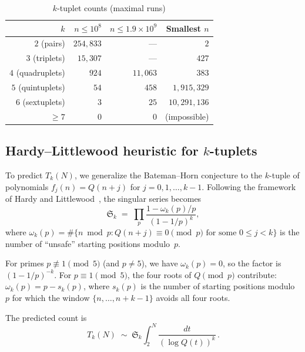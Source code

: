 \documentclass[11pt,a4paper]{article}
\theoremstyle{plain}
\theoremstyle{definition}
\theoremstyle{remark}
\begin{document}
\begin{table}[ht]
\centering
\caption{$k$-tuplet counts (maximal runs)}
\label{tab:tuplets}
\smallskip
\begin{tabular}{@{}rrrr@{}}
\toprule
$k$ & $n \le 10^8$ & $n \le 1.9 \times 10^9$ & Smallest $n$ \\
\midrule
$2$ (pairs) & $254{,}833$ & --- & $2$ \\
$3$ (triplets)  & $15{,}307$  & --- & $427$ \\
$4$ (quadruplets) & $924$ & $11{,}063$ & $383$ \\
$5$ (quintuplets) & $54$ & $458$ & $1{,}915{,}329$ \\
$6$ (sextuplets)  & $3$  & $25$  & $10{,}291{,}136$ \\
$\ge 7$ & $0$ & $0$ & (impossible) \\
\bottomrule
\end{tabular}
\end{table}


\subsection{Hardy--Littlewood heuristic for $k$-tuplets}

To predict $T_k(N)$, we generalize the Bateman--Horn conjecture to the $k$-tuple of polynomials $f_j(n) = Q(n + j)$ for $j = 0, 1, \ldots, k-1$. Following the framework of Hardy and Littlewood~\cite{hardy1923}, the singular series becomes
\begin{equation}\label{eq:Sk}
\mathfrak{S}_k \;=\; \prod_{p} \frac{1 - \omega_k(p)/p}{(1 - 1/p)^k},
\end{equation}
where $\omega_k(p) = \#\{n \bmod p : Q(n+j) \equiv 0 \pmod{p} \text{ for some } 0 \le j < k\}$ is the number of ``unsafe'' starting positions modulo~$p$.

For primes $p \not\equiv 1 \pmod{5}$ (and $p \ne 5$), we have $\omega_k(p) = 0$, so the factor is $(1 - 1/p)^{-k}$. For $p \equiv 1 \pmod{5}$, the four roots of $Q \pmod{p}$ contribute: $\omega_k(p) = p - s_k(p)$, where $s_k(p)$ is the number of starting positions modulo $p$ for which the window $\{n, \ldots, n+k-1\}$ avoids all four roots.

The predicted count is
\begin{equation}\label{eq:Tkpred}
T_k(N) \;\sim\; \mathfrak{S}_k \int_2^N \frac{dt}{(\log Q(t))^k}\,.
\end{equation}
\end{document}
